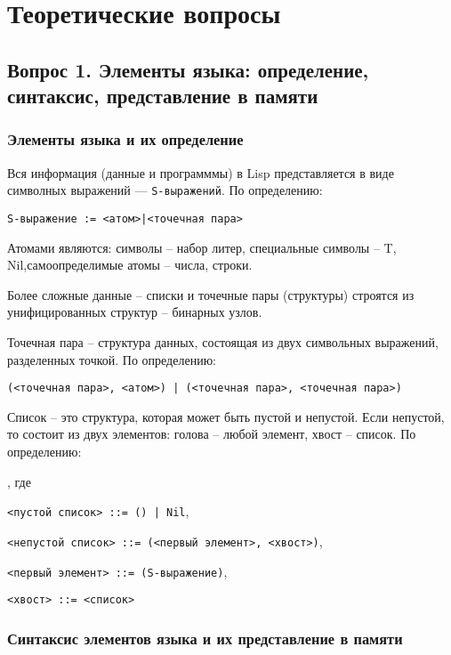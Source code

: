 \chapter{Теоретические вопросы}

\section*{Вопрос 1. Элементы языка: определение, синтаксис, представление в памяти}
\subsection*{Элементы языка и их определение}

Вся информация (данные и программмы) в Lisp представляется в виде символных выражений	 --- \texttt{S-выражений}. По определению:

\texttt{S-выражение := <атом>|<точечная пара>}

Атомами являются: символы -- набор литер, специальные символы -- {T, Nil},самоопределимые атомы -- числа, строки.

Более сложные данные -- списки и точечные пары (структуры) строятся из унифицированных структур -- бинарных узлов.

Точечная пара -- структура данных, состоящая из двух символьных выражений, разделенных точкой. По определению:


{\texttt{(<точечная пара>, <атом>) | (<точечная пара>, <точечная пара>)}}

Список -- это структура, которая может быть пустой и непустой. Если непустой, то состоит из двух элементов: голова -- любой элемент, хвост -- список. По определению:

, где

{\texttt{<пустой список> ::= () | Nil}},

{\texttt{<непустой список> ::= (<первый элемент>, <хвост>)}},

{\texttt{<первый элемент> ::= (S-выражение)}},

{\texttt{<хвост> ::= <список>}}

\subsection*{Синтаксис элементов языка и их представление в памяти}

